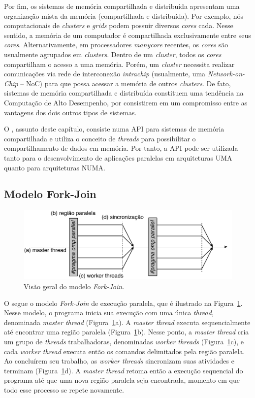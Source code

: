 \documentclass{SBCbookchapter}
\begin{document}
		Por fim, os sistemas de memória compartilhada e distribuída
		apresentam uma organização mista da memória (compartilhada e
		distribuída). Por exemplo, nós computacionais de
		\textit{clusters} e \textit{grids} podem possuir diversos
		\textit{cores} cada. Nesse sentido, a memória de um computador é
		compartilhada exclusivamente entre seus \textit{cores}.
		Alternativamente, em processadores \textit{manycore} recentes,
		os \textit{cores} são usualmente agrupados em \textit{clusters}.
		Dentro de um \textit{cluster}, todos os \textit{cores}
		compartilham o acesso a uma memória.  Porém, um \textit{cluster}
		necessita realizar comunicações via rede de interconexão
		\textit{intrachip} (usualmente, uma \textit{Network-on-Chip} --
		NoC) para que possa acessar a memória de outros
		\textit{clusters}. De fato, sistemas de memória compartilhada e
		distribuída constituem uma tendência na Computação de Alto
		Desempenho, por consistirem em um compromisso entre as vantagens
		dos dois outros tipos de sistemas.

		O \openmp, assunto deste capítulo, consiste numa API para
		sistemas de memória compartilhada e utiliza o conceito de
		\textit{threads} para possibilitar o compartilhamento de dados
		em memória. Por tanto, a API pode ser utilizada tanto para o
		desenvolvimento de aplicações paralelas em arquiteturas UMA
		quanto para arquiteturas NUMA.
		
	\subsection{Modelo Fork-Join}

		\begin{figure}[t]
			\centering
			\includegraphics[width=0.8\linewidth]{img/fork-join}
			\caption{Visão geral do modelo \textit{Fork-Join}.}\label{fig:fork-join}
		\end{figure}

		O \openmp segue o modelo \textit{Fork-Join} de execução paralela, que é
		ilustrado na Figura~\ref{fig:fork-join}. Nesse modelo, o
		programa inicia sua execução com uma única \textit{thread},
		denominada \textit{master thread} (Figura~\ref{fig:fork-join}a).
		A \textit{master thread} executa sequencialmente até encontrar
		uma região paralela (Figura~\ref{fig:fork-join}b). Nesse ponto,
		a \textit{master thread} cria um grupo de \textit{threads}
		trabalhadoras, denominadas \textit{worker threads}
		(Figura~\ref{fig:fork-join}c), e cada \textit{worker thread}
		executa então os comandos delimitados pela região paralela. Ao
		concluírem seu trabalho, as \textit{worker threads} sincronizam
		suas atividades e terminam (Figura~\ref{fig:fork-join}d). A
		\textit{master thread} retoma então a execução sequencial do
		programa até que uma nova região paralela seja encontrada,
		momento em que todo esse processo se repete novamente.
		
\end{document}
